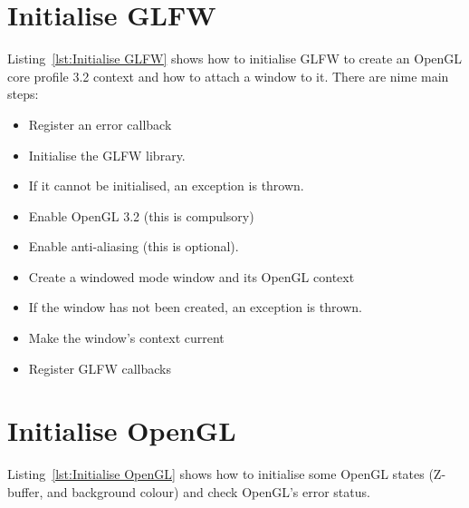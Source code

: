 \documentclass[11pt,oneside,a4paper,final]{article}
\begin{document}
\begin{center}

\end{center}


\section{Initialise GLFW}
\label{sec:Initialise GLFW}

Listing~\ref{lst:Initialise GLFW} shows how to initialise GLFW to create an 
OpenGL core profile 3.2 context and how to attach a window to it. There are 
nime main steps:
\begin{itemize}
    \item Register an error callback
    \item Initialise the GLFW library.
    \item If it cannot be initialised, an exception is thrown.
    \item Enable OpenGL 3.2 (this is compulsory)
    \item Enable anti-aliasing (this is optional).
    \item Create a windowed mode window and its OpenGL context
    \item If the window has not been created, an exception is thrown.
    \item Make the window's context current
    \item Register GLFW callbacks
\end{itemize}

\begin{center}

\end{center}


\section{Initialise OpenGL}
\label{sec:Initialise OpenGL}

Listing~\ref{lst:Initialise OpenGL} shows how to initialise some OpenGL states 
(Z-buffer, and background colour) and check OpenGL's error status. 

\begin{center}

\end{center}
\end{document}
